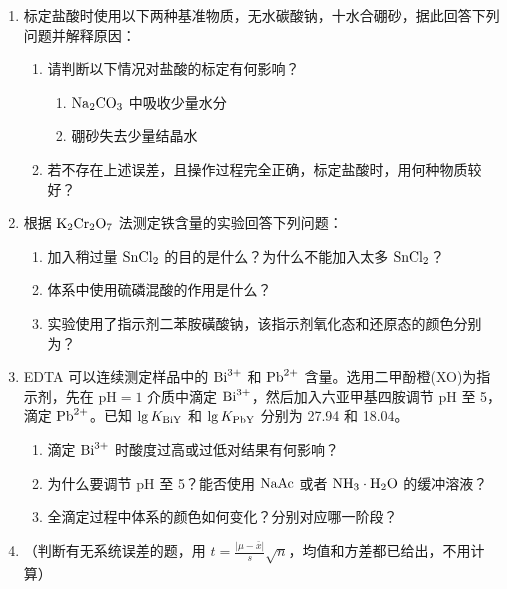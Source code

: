 \begin{enumerate}[label=\arabic*., itemsep=1.5ex]
    \item 标定盐酸时使用以下两种基准物质，无水碳酸钠，十水合硼砂，据此回答下列问题并解释原因：
    \begin{enumerate}[label=(\arabic*), noitemsep, topsep=0pt, partopsep=0pt]
        \item 请判断以下情况对盐酸的标定有何影响？
        \begin{enumerate}[label=\alph*., noitemsep, topsep=0pt, partopsep=0pt]
            \item $\ce{Na2CO3}$ 中吸收少量水分
            \item 硼砂失去少量结晶水
        \end{enumerate}
        \item 若不存在上述误差，且操作过程完全正确，标定盐酸时，用何种物质较好？
    \end{enumerate}

    \item 根据 $\ce{K2Cr2O7}$ 法测定铁含量的实验回答下列问题：
    \begin{enumerate}[label=(\arabic*), noitemsep, topsep=0pt, partopsep=0pt]
        \item 加入稍过量 $\ce{SnCl2}$ 的目的是什么？为什么不能加入太多 $\ce{SnCl2}$？
        \item 体系中使用硫磷混酸的作用是什么？
        \item 实验使用了指示剂二苯胺磺酸钠，该指示剂氧化态和还原态的颜色分别为？
    \end{enumerate}

    \item EDTA 可以连续测定样品中的 $\ce{Bi^{3+}}$ 和 $\ce{Pb^{2+}}$ 含量。选用二甲酚橙(XO)为指示剂，先在 $\text{pH}=1$ 介质中滴定 $\ce{Bi^{3+}}$，然后加入六亚甲基四胺调节 $\text{pH}$ 至 5，滴定 $\ce{Pb^{2+}}$。已知 $\lg K_{\ce{BiY}}$ 和 $\lg K_{\ce{PbY}}$ 分别为 27.94 和 18.04。
    \begin{enumerate}[label=(\arabic*), noitemsep, topsep=0pt, partopsep=0pt]
        \item 滴定 $\ce{Bi^{3+}}$ 时酸度过高或过低对结果有何影响？
        \item 为什么要调节 $\text{pH}$ 至 5？能否使用 $\ce{NaAc}$ 或者 $\ce{NH3\cdot H2O}$ 的缓冲溶液？
        \item 全滴定过程中体系的颜色如何变化？分别对应哪一阶段？
    \end{enumerate}

    \item （判断有无系统误差的题，用 $t = \frac{|\mu - \bar{x}|}{s}\sqrt{n}$，均值和方差都已给出，不用计算）


\end{enumerate}
